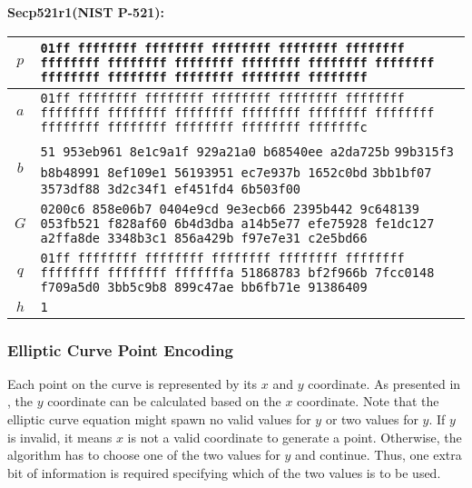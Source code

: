 \textbf{Secp521r1(NIST P-521):}
\begin{center}
\begin{tabular}{|c|p{9.8cm}|} \hline
    $p$ &   \texttt{\phantom{0000}01ff ffffffff ffffffff ffffffff ffffffff ffffffff} \newline
            \texttt{ffffffff ffffffff ffffffff ffffffff ffffffff ffffffff} \newline
            \texttt{ffffffff ffffffff ffffffff ffffffff ffffffff} \\ \hline
    $a$ &   \texttt{\phantom{0000}01ff ffffffff ffffffff ffffffff ffffffff ffffffff} \newline
            \texttt{ffffffff ffffffff ffffffff ffffffff ffffffff ffffffff} \newline
            \texttt{ffffffff ffffffff ffffffff ffffffff fffffffc} \\ \hline
    $b$ &   \texttt{\phantom{000000}51 953eb961 8e1c9a1f 929a21a0 b68540ee a2da725b} \newline
            \texttt{99b315f3 b8b48991 8ef109e1 56193951 ec7e937b 1652c0bd} \newline
            \texttt{3bb1bf07 3573df88 3d2c34f1 ef451fd4 6b503f00} \\ \hline
    $G$ &   \texttt{\phantom{00}0200c6 858e06b7 0404e9cd 9e3ecb66 2395b442 9c648139} \newline
            \texttt{053fb521 f828af60 6b4d3dba a14b5e77 efe75928 fe1dc127} \newline
            \texttt{a2ffa8de 3348b3c1 856a429b f97e7e31 c2e5bd66} \\ \hline
    $q$ &   \texttt{\phantom{0000}01ff ffffffff ffffffff ffffffff ffffffff ffffffff} \newline
            \texttt{ffffffff ffffffff fffffffa 51868783 bf2f966b 7fcc0148} \newline
            \texttt{f709a5d0 3bb5c9b8 899c47ae bb6fb71e 91386409} \\ \hline
    $h$ &   \texttt{1} \\ \hline
\end{tabular}
\end{center}


\subsubsection{Elliptic Curve Point Encoding}
Each point on the curve is represented by its $x$ and $y$ coordinate. As presented in \cite{Trappe05}, the $y$ coordinate can be calculated based on the $x$ coordinate. Note that the elliptic curve equation might spawn no valid values for $y$ or two values for $y$. If $y$ is invalid, it means $x$ is not a valid coordinate to generate a point. Otherwise, the algorithm has to choose one of the two values for $y$ and continue. Thus, one extra bit of information is required specifying which of the two values is to be used.

